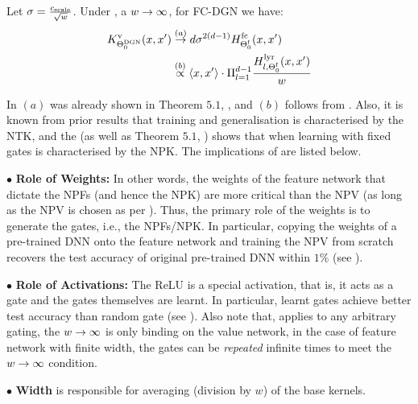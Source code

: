 \begin{theorem}\label{th:main} Let $\sigma=\frac{c_{\text{scale}}}{\sqrt{w}}$. Under , a $w\rightarrow\infty$, for FC-DGN we have: 
\begin{align*}
K^{\text{v}}_{\Theta^{\text{DGN}}_0}(x,x')&\stackrel{(a)}{\rightarrow} d \sigma^{2(d-1)} H^{\text{fc}}_{\Theta^{\textrm{f}}_0}(x,x')\\ 
&\stackrel{(b)}\propto \langle x,x'\rangle\cdot \Pi_{l=1}^{d-1} \frac{H^{\text{lyr}}_{l,\Theta^{\textrm{f}}_0}(x,x')}{w}
\end{align*}
\end{theorem}
In  $(a)$ was already shown in {Theorem $5.1$}, \cite{npk}, and $(b)$ follows from . Also, it is known from prior results \cite{arora2019exact,cao2019generalization} that training and generalisation is characterised by the NTK, and the  (as well as {Theorem $5.1$}, \cite{npk}) shows that when learning with fixed gates is characterised by the NPK. The implications of  are listed below.

$\bullet$ \textbf{Role of Weights:}  In other words, the weights of the feature network that dictate the NPFs (and hence the NPK) are more critical than the NPV (as long as the NPV is chosen as per ). Thus, the primary role of the weights is to generate the gates, i.e., the NPFs/NPK. In particular, copying the weights of a pre-trained DNN onto the feature network and training the NPV from scratch recovers the test accuracy of original pre-trained DNN within $1\%$ (see ). 

$\bullet$ \textbf{Role of Activations:} The ReLU is a special activation, that is, it acts as a gate and the gates themselves are learnt. In particular, learnt gates achieve better test accuracy than random gate (see ). Also note that,  applies to any arbitrary gating, the $w\rightarrow\infty$ is only binding on the value network, in the case of feature network with finite width, the gates can be \emph{repeated} infinite times to meet the $w\rightarrow\infty$ condition. 

$\bullet$ \textbf{Width} is responsible for averaging (division by $w$) of the base kernels.

